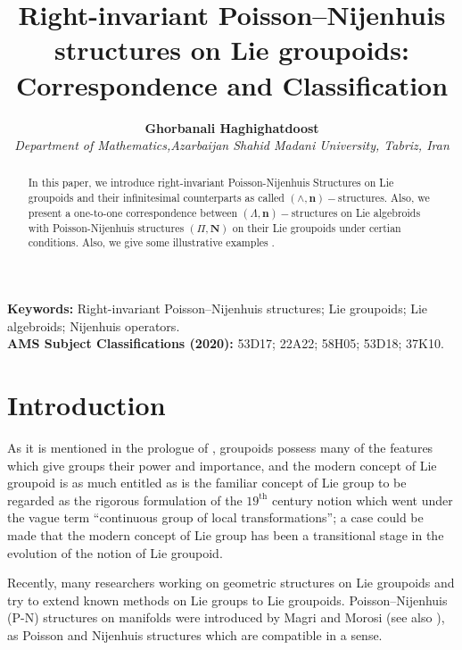\documentclass{article}
\newcommand{\LL}{\Lambda}
\begin{document}
\title {\large{\bf Right-invariant Poisson–Nijenhuis structures on Lie groupoids:\\ Correspondence and Classification}}
\vspace{2mm}
\author {\small{ \bf  Ghorbanali Haghighatdoost}\hspace{-1mm}\\
{\small{\em Department of Mathematics,Azarbaijan Shahid Madani University, Tabriz, Iran}}\\
           }
 \maketitle
 
\begin{abstract}
In this paper, we introduce right-invariant Poisson-Nijenhuis  Structures on Lie groupoids and their infinitesimal counterparts as called $(\wedge , \mathbf{n})-$structures. Also, we present a one-to-one correspondence between $(\LL  ,\mathbf{n})-$structures on Lie algebroids with Poisson-Nijenhuis structures $(\Pi , \mathbf{N})$ on their Lie groupoids under certian conditions. Also, we give some illustrative examples .
\end{abstract}

\noindent\textbf{Keywords:} Right-invariant Poisson--Nijenhuis structures; Lie groupoids; Lie algebroids; Nijenhuis operators.\\
\textbf{AMS Subject Classifications (2020):} 53D17; 22A22; 58H05; 53D18; 37K10.
\section{Introduction}

As it is mentioned in the prologue of \cite{Kiril0Mackenzie}, groupoids possess many of the features which give groups their power and importance, and the modern concept of Lie groupoid is as much entitled as is the familiar concept of Lie group to be regarded as the rigorous formulation of the $19^{\text{th}}$ century notion which went under the vague term ``continuous group of local transformations''; a case could be made that the modern concept of Lie group has been a transitional stage in the evolution of the notion of Lie groupoid.

Recently, many researchers working on geometric structures on Lie groupoids and try to extend known methods on Lie groups to Lie groupoids. Poisson–Nijenhuis (P-N) structures on manifolds were introduced by Magri and Morosi \cite{Magri} (see also \cite{Kosmann3}), as Poisson and Nijenhuis structures which are compatible in a sense.
\end{document}
